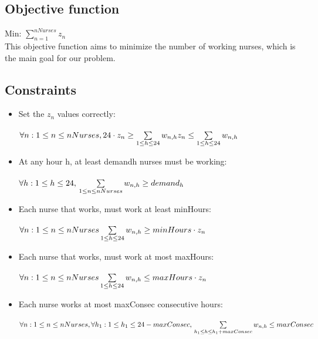 \subsection{Objective function}

Min: $ \sum\limits_{n=1}^{nNurses} z_{n}  $ \\

This objective function aims to minimize the number of working nurses, which is the main goal for our problem.

\subsection{Constraints}

\begin{itemize}
\item  Set the $z_n$ values correctly: \\ \\
$  \forall n: 1 \leq n \leq nNurses,  \\
	24 \cdot z_{n}  \geq \sum\limits_{1 \leq h \leq 24} w_{n,h} \\
   z_{n} \leq \sum\limits_{1 \leq h \leq 24} w_{n,h}
$

\item  At any hour h, at least demandh nurses must be working: \\ \\
$ \forall h : 1 \leq h \leq 24, \\
 \sum\limits_{1 \leq n \leq nNurses} w_{n,h} \geq demand_{h}
$

\item  Each nurse that works, must work at least minHours: \\ \\
$ \forall n: 1 \leq n \leq nNurses \\
	\sum\limits_{1 \leq h \leq 24} w_{n,h} \geq minHours \cdot z_{n}
$

\item  Each nurse that works, must work at most maxHours: \\ \\
$ \forall n: 1 \leq n \leq nNurses \\
	\sum\limits_{1 \leq h \leq 24} w_{n,h} \leq maxHours \cdot z_{n}
$

\item  Each nurse works at most maxConsec consecutive hours: \\ \\
$	\forall n:  1 \leq n \leq nNurses, \\
	\forall h_{1}:  1 \leq h_{1} \leq 24 - maxConsec, \\
	\sum\limits_{ h_{1} \leq h \leq h_{1} + maxConsec} w_{n,h} \leq maxConsec $


\end{itemize}
